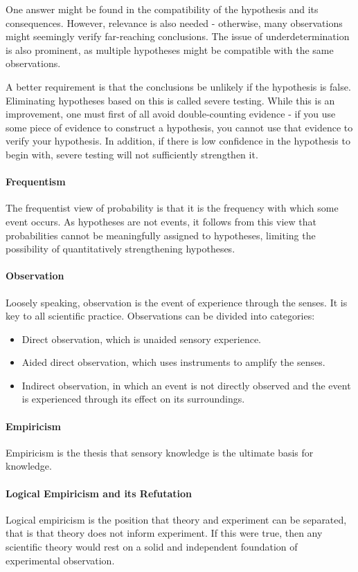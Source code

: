 One answer might be found in the compatibility of the hypothesis and its consequences. However, relevance is also needed - otherwise, many observations might seemingly verify far-reaching conclusions. The issue of underdetermination is also prominent, as multiple hypotheses might be compatible with the same observations.

A better requirement is that the conclusions be unlikely if the hypothesis is false. Eliminating hypotheses based on this is called severe testing. While this is an improvement, one must first of all avoid double-counting evidence - if you use some piece of evidence to construct a hypothesis, you cannot use that evidence to verify your hypothesis. In addition, if there is low confidence in the hypothesis to begin with, severe testing will not sufficiently strengthen it.

\paragraph{Frequentism}
The frequentist view of probability is that it is the frequency with which some event occurs. As hypotheses are not events, it follows from this view that probabilities cannot be meaningfully assigned to hypotheses, limiting the possibility of quantitatively strengthening hypotheses.

\paragraph{Observation}
Loosely speaking, observation is the event of experience through the senses. It is key to all scientific practice. Observations can be divided into categories:
\begin{itemize}
	\item Direct observation, which is unaided sensory experience.
	\item Aided direct observation, which uses instruments to amplify the senses.
	\item Indirect observation, in which an event is not directly observed and the event is experienced through its effect on its surroundings.
\end{itemize}

\paragraph{Empiricism}
Empiricism is the thesis that sensory knowledge is the ultimate basis for knowledge.

\paragraph{Logical Empiricism and its Refutation}
Logical empiricism is the position that theory and experiment can be separated, that is that theory does not inform experiment. If this were true, then any scientific theory would rest on a solid and independent foundation of experimental observation.

